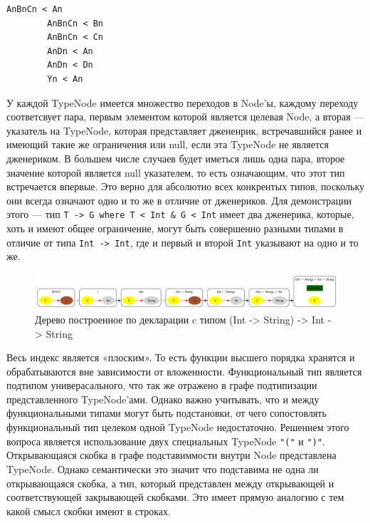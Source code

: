 \documentclass[times]{itmo-student-thesis}
\begin{document}
	
	\begin{lstlisting}[caption={Отношение подтипизации для типов с рисунка ~\ref{subtypegraphhard}},label={subtyping_relations}]
        AnBnCn < An
		AnBnCn < Bn
		AnBnCn < Cn
		AnDn < An
		AnDn < Dn
		Yn < An
	\end{lstlisting}
	
	У каждой TypeNode имеется множество переходов в Node'ы, каждому переходу соответсвует пара, первым элементом которой является целевая Node, а вторая --- указатель на TypeNode, которая представляет джененрик, встречавшийся ранее и имеющий такие же ограничения или null, если эта TypeNode не является дженериком. В большем числе случаев будет иметься лишь одна пара, второе значение которой является null указателем, то есть означающим, что этот тип встречается впервые. Это верно для абсолютно всех конкрентых типов, поскольку они всегда означают одно и то же в отличие от дженериков. Для демонстрации этого --- тип \lstinline{T -> G where T < Int & G < Int} имеет два дженерика, которые, хоть и имеют общее ограничение, могут быть совершенно разными типами в отличие от типа \lstinline{Int -> Int}, где и первый и второй \lstinline{Int} указывают на одно и то же. 
	
	\begin{figure}[!h]
		\caption{Дерево построенное по декларации c типом (Int -> String) -> Int -> String} \label{subtypegraph}
		\centering
		\includegraphics[width=0.8\columnwidth]{images/graph_with_hof.png}
	\end{figure}
	
	Весь индекс является «плоским». То есть функции высшего порядка хранятся и обрабатываются вне зависимости от вложенности. Функциональный тип является подтипом универасального, что так же отражено в графе подтипизации представленного TypeNode'ами. Однако важно учитывать, что и между функциональными типами могут быть подстановки, от чего сопостовлять функциональный тип целеком одной TypeNode недостаточно. Решением этого вопроса является использование двух специальных TypeNode  \lstinline{"("} и  \lstinline{")"}. Открывающаяся скобка в графе подставиммости внутри Node представлена TypeNode. Однако семантически это значит что подставима не одна ли открывающаяся скобка, а тип, который представлен между открывающей и соответствующей закрывающей скобками. Это имеет прямую аналогию с тем какой смысл скобки имеют в строках.
	
\end{document}
